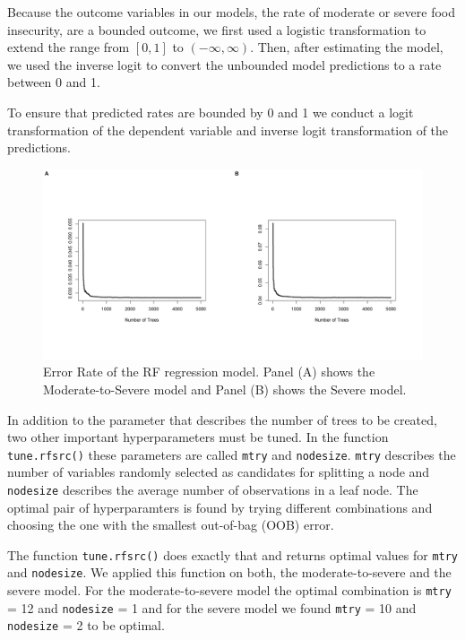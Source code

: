 \documentclass{article}
\begin{document}
Because the outcome variables in our models, the rate of moderate or severe food insecurity, are a bounded outcome, we first used a logistic transformation to extend the range from $[0,1]$ to $(-\infty, \infty)$.  Then, after estimating the model, we used the inverse logit to convert the unbounded model predictions to a rate between 0 and 1.

To ensure that predicted rates are bounded by 0 and 1 we conduct a logit transformation of the dependent variable and inverse logit transformation of the predictions. 

\begin{figure}[H]
  \centering
  \includegraphics[width=\linewidth]{img/model/error_rf.png}
  \caption{Error Rate of the RF regression model. Panel (A) shows the Moderate-to-Severe model and Panel (B) shows the Severe model.}
  \label{fig:rf_error}
\end{figure}


In addition to the parameter that describes the number of trees to be created, two other important hyperparameters must be tuned. In the function \texttt{tune.rfsrc()} these parameters are called \texttt{mtry} and \texttt{nodesize}. \texttt{mtry} describes the number of variables randomly selected as candidates for splitting a node and \texttt{nodesize} describes the average number of observations in a leaf node. The optimal pair of hyperparamters is found by trying different combinations and choosing the one with the smallest out-of-bag (OOB) error.


The function \texttt{tune.rfsrc()} does exactly that and returns optimal values for \texttt{mtry} and \texttt{nodesize}. We applied this function on both, the moderate-to-severe and the severe model. For the moderate-to-severe model the optimal combination is \texttt{mtry} = 12 and \texttt{nodesize} = 1 and for the severe model we found \texttt{mtry} = 10 and \texttt{nodesize} = 2 to be optimal.
\end{document}
